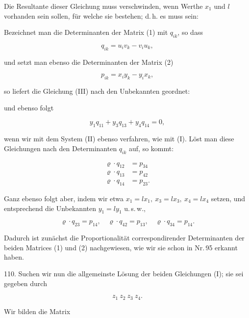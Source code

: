 Die Resultante dieser Gleichung muss verschwinden, wenn Werthe $x_1$ und $l$ vorhanden sein sollen, für welche sie bestehen; d.\,h. es muss sein:


Bezeichnet man die Determinanten der Matrix (1) mit $q_{ik}$, so dass

\[ q_{ik} = u_iv_k - v_iu_k, \]

und setzt man ebenso die Determinanten der Matrix (2)

\[ p_{ik} = x_iy_k - y_ix_k, \]

so liefert die Gleichung (III) nach den Unbekannten geordnet:


und ebenso folgt

\[ y_1q_{11}+y_3q_{13}+y_4q_{14}=0, \] %

wenn wir mit dem System (II) ebenso verfahren, wie mit (I). Löst man diese Gleichungen nach den Determinanten $q_{ik}$ auf, so kommt:

\[ \begin{aligned} \varrho\cdot q_{12} &= p_{34}\\ \varrho\cdot q_{13} &= p_{42}\\ \varrho\cdot q_{14} &= p_{23}. \end{aligned} \]



Ganz ebenso folgt aber, indem wir etwa $x_1=lx_1,\ x_3=lx_3,\ x_4=lx_4$ setzen, und entsprechend die Unbekannten $y_1=ly_1$ u.\,s.\,w.,

\[ \varrho\cdot q_{23}=p_{14},\quad \varrho\cdot q_{42}=p_{13},\quad \varrho\cdot q_{34}=p_{14}. \]

Dadurch ist zunächst die Proportionalität correspondirender Determinanten der beiden Matrices (1) und (2) nachgewiesen, wie wir sie schon in Nr.\,95 erkannt haben.

110. Suchen wir nun die allgemeinste Lösung der beiden Gleichungen (I); sie sei gegeben durch

\[ z_1\ z_2\ z_3\ z_4. \]

Wir bilden die Matrix

